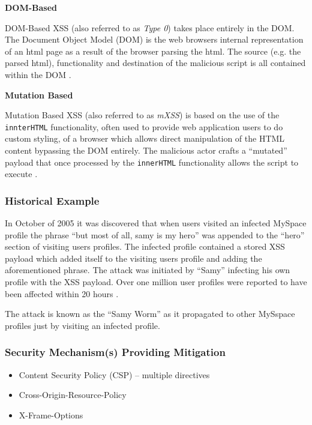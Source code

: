\documentclass{mscreport}
\begin{document}
\vspace{0.6cm} \noindent
\textbf{DOM-Based}

\vspace{0.2cm} \noindent
DOM-Based XSS (also referred to as \textit{Type 0}) takes place entirely in the DOM. The Document Object Model (DOM) is the web browsers internal representation of an html page as a result of the browser parsing the html. The source (e.g. the parsed html), functionality and destination of the malicious script is all contained within the DOM \cite{Rodriguez2020-bg,Klein2005-hx}.

\vspace{0.6cm} \noindent
\textbf{Mutation Based}

\vspace{0.2cm} \noindent
Mutation Based XSS (also referred to as \textit{mXSS}) is based on the use of the \texttt{innterHTML} functionality, often used to provide web application users to do custom styling, of a browser which allows direct manipulation of the HTML content bypassing the DOM entirely. The malicious actor crafts a ``mutated'' payload that once processed by the \texttt{innerHTML} functionality allows the script to execute \cite{Heiderich2013-qv}.

\subsubsection{Historical Example}
In October of 2005 it was discovered that when users visited an infected MySpace profile the phrase ``but most of all, samy is my hero'' was appended to the ``hero'' section of visiting users profiles. The infected profile contained a stored XSS payload which added itself to the visiting users profile and adding the aforementioned phrase. The attack was initiated by ``Samy'' infecting his own profile with the XSS payload. Over one million user profiles were reported to have been affected within 20 hours \cite{Lee2019-xf}.

\vspace{0.2cm} \noindent
The attack is known as the ``Samy Worm'' as it propagated to other MySspace profiles just by visiting an infected profile.

\subsubsection{Security Mechanism(s) Providing Mitigation}

\begin{itemize}
	\setlength\itemsep{0.1em}
	\item Content Security Policy (CSP) – multiple directives
	\item Cross-Origin-Resource-Policy
	\item X-Frame-Options
\end{itemize}
\end{document}
